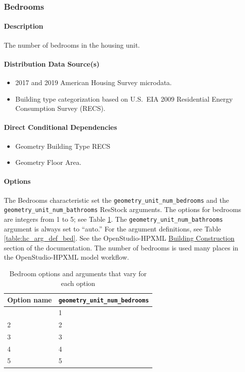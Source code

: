 \subsubsection{Bedrooms}

\paragraph{Description}
The number of bedrooms in the housing unit.

\paragraph{Distribution Data Source(s)}
\begin{itemize}
    \item 2017 and 2019 American Housing Survey microdata.
    \item Building type categorization based on U.S.~EIA 2009 Residential Energy Consumption Survey (RECS).
\end{itemize}

\paragraph{Direct Conditional Dependencies}
\begin{itemize}
    \item Geometry Building Type RECS
    \item Geometry Floor Area.
\end{itemize}

\paragraph{Options}
The Bedrooms characteristic set the \texttt{geometry\_unit\_num\_bedrooms} and the \texttt{geometry\_unit\_num\_bathrooms} ResStock arguments. The options for bedrooms are integers from 1 to 5; see Table \ref{table:hc_opt_bed}. The \texttt{geometry\_unit\_num\_bathrooms} argument is always set to ``auto.'' For the argument definitions, see Table \ref{table:hc_arg_def_bed}. See the OpenStudio-HPXML \href{https://openstudio-hpxml.readthedocs.io/en/v1.8.1/workflow_inputs.html#hpxml-building-construction}{Building Construction} section of the documentation. The number of bedrooms is used many places in the OpenStudio-HPXML model workflow.

\begin{longtable}[]{ |p{}|p{4cm}| }
\caption{Bedroom options and arguments that vary for each option} \label{table:hc_opt_bed} \\
\toprule\noalign{}
Option name & \texttt{geometry\_unit\_num\_bedrooms} \\
\midrule\noalign{}
\endhead
\bottomrule\noalign{}
\endlastfoot
1 & 1 \\
\hline
2 & 2 \\
\hline
3 & 3 \\
\hline
4 & 4 \\
\hline
5 & 5 \\
\end{longtable}

